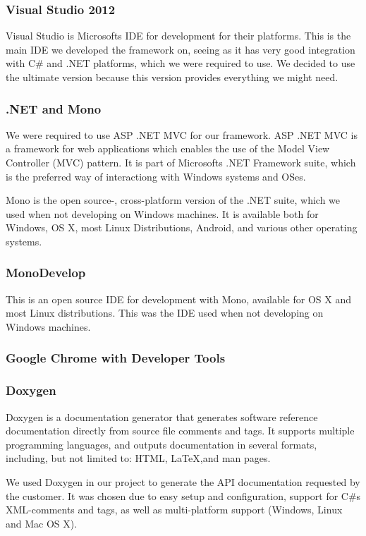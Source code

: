 \subsubsection{Visual Studio 2012}
Visual Studio is Microsofts IDE for development for their platforms. This is the main IDE we developed the framework on, seeing as it has very good integration with C\# and .NET platforms, which we were required to use. We decided to use the ultimate version because this version provides everything we might need.

\subsubsection{.NET and Mono}
We were required to use ASP .NET MVC for our framework. ASP .NET MVC is a framework for web applications which enables the use of the Model View Controller (MVC) pattern. It is part of Microsofts .NET Framework suite, which is the preferred way of interactiong with Windows systems and OSes.

Mono is the open source-, cross-platform version of the .NET suite, which we used when not developing on Windows machines. It is available both for Windows, OS X, most Linux Distributions, Android, and various other operating systems.

\subsubsection{MonoDevelop}
This is an open source IDE for development with Mono, available for OS X and most Linux distributions. This was the IDE used when not developing on Windows machines.

\subsubsection{Google Chrome with Developer Tools}

\subsubsection{Doxygen}
Doxygen is a documentation generator that generates software reference documentation directly from source file comments and tags. It supports multiple programming languages, and outputs documentation in several formats, including, but not limited to: HTML, {LaTeX},and man pages.

We used Doxygen in our project to generate the API documentation requested by the customer. It was chosen due to easy setup and configuration, support for C\#s XML-comments and tags, as well as multi-platform support (Windows, Linux and Mac OS X).


